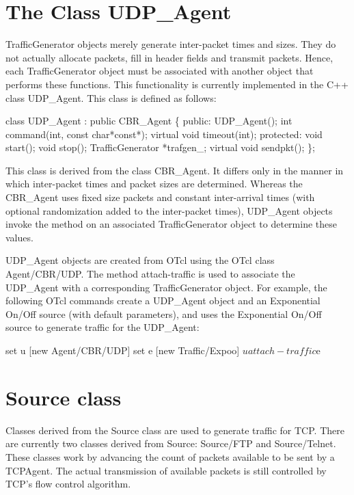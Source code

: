 \section{The Class UDP\_Agent}

TrafficGenerator objects merely generate inter-packet times and sizes.
They do not actually allocate packets, fill in header fields and
transmit packets.  Hence, each TrafficGenerator object must be
associated with another object that performs these functions.  This
functionality is currently implemented in the C++ class UDP\_Agent.
This class is defined as follows:
\begin{program}
        class UDP_Agent : public CBR_Agent \{
        public:
                UDP_Agent();
                int command(int, const char*const*);
                virtual void timeout(int);
        protected:
                void start();
                void stop();
                TrafficGenerator *trafgen_;
                virtual void sendpkt();
        \};
\end{program}
This class is derived from the class CBR\_Agent.
It differs only in
the manner in which inter-packet times and packet sizes are
determined.
Whereas the CBR\_Agent uses fixed size packets and
constant inter-arrival times (with optional randomization added to the
inter-packet times), UDP\_Agent objects invoke the 
method on an associated TrafficGenerator object to determine these
values.  

UDP\_Agent objects are created from OTcl using the OTcl class
Agent/CBR/UDP.  The method attach-traffic is used to associate the
UDP\_Agent with a corresponding TrafficGenerator object.  For example,
the following OTcl commands create a UDP\_Agent object and an
Exponential On/Off source (with default parameters), and uses the
Exponential On/Off source to generate traffic for the UDP\_Agent:
\begin{program}
        set u [new Agent/CBR/UDP]
        set e [new Traffic/Expoo]
        $u attach-traffic $e
\end{program}


\section{Source class}
\label{sec:sourceobjects}
 
Classes derived from the Source class are used to generate traffic for TCP.
There are currently two classes derived from Source:
Source/FTP and Source/Telnet.
These classes work by advancing the
count of packets available to be sent by a TCPAgent.
The actual transmission of available packets
is still controlled by TCP's flow control algorithm.
 
